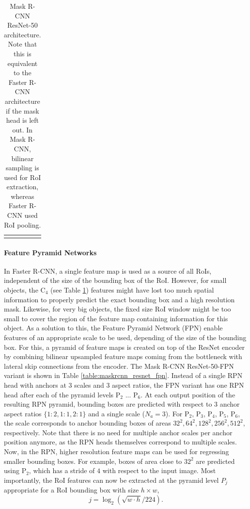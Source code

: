 {\begin{longtable}{llr}
\bottomrule

\caption {
Mask R-CNN \cite{MaskRCNN} ResNet-50 \cite{ResNet} architecture.
Note that this is equivalent to the Faster R-CNN architecture if the mask
head is left out. In Mask R-CNN, bilinear sampling is used for RoI extraction,
whereas Faster R-CNN used RoI pooling.
}
\label{table:maskrcnn_resnet}
\end{longtable}
}

\paragraph{Feature Pyramid Networks}
In Faster R-CNN, a single feature map is used as a source of all RoIs, independent
of the size of the bounding box of the RoI.
However, for small objects, the C$_4$ (see Table \ref{table:maskrcnn_resnet}) features
might have lost too much spatial information to properly predict the exact bounding
box and a high resolution mask. Likewise, for very big objects, the fixed size
RoI window might be too small to cover the region of the feature map containing
information for this object.
As a solution to this, the Feature Pyramid Network (FPN) \cite{FPN} enable features
of an appropriate scale to be used, depending of the size of the bounding box.
For this, a pyramid of feature maps is created on top of the ResNet \cite{ResNet}
encoder by combining bilinear upsampled feature maps coming from the bottleneck
with lateral skip connections from the encoder.
The Mask R-CNN ResNet-50-FPN variant is shown in Table \ref{table:maskrcnn_resnet_fpn}.
Instead of a single RPN head with anchors at 3 scales and 3 aspect ratios,
the FPN variant has one RPN head after each of the pyramid levels P$_2$ ... P$_6$.
At each output position of the resulting RPN pyramid, bounding boxes are predicted
with respect to 3 anchor aspect ratios $\{1:2, 1:1, 2:1\}$ and a single scale ($N_a = 3$).
For P$_2$, P$_3$, P$_4$, P$_5$, P$_6$,
the scale corresponds to anchor bounding boxes of areas $32^2, 64^2, 128^2, 256^2, 512^2$,
respectively.
Note that there is no need for multiple anchor scales per anchor position anymore,
as the RPN heads themselves correspond to multiple scales.
Now, in the RPN, higher resolution feature maps can be used for regressing smaller
bounding boxes. For example, boxes of area close to $32^2$ are predicted using P$_2$,
which has a stride of $4$ with respect to the input image.
Most importantly, the RoI features can now be extracted at the pyramid level $P_j$ appropriate for a
RoI bounding box with size $h \times w$,
\begin{equation}
j = \log_2(\sqrt{w \cdot h} / 224). %
\label{eq:level_assignment}
\end{equation}


